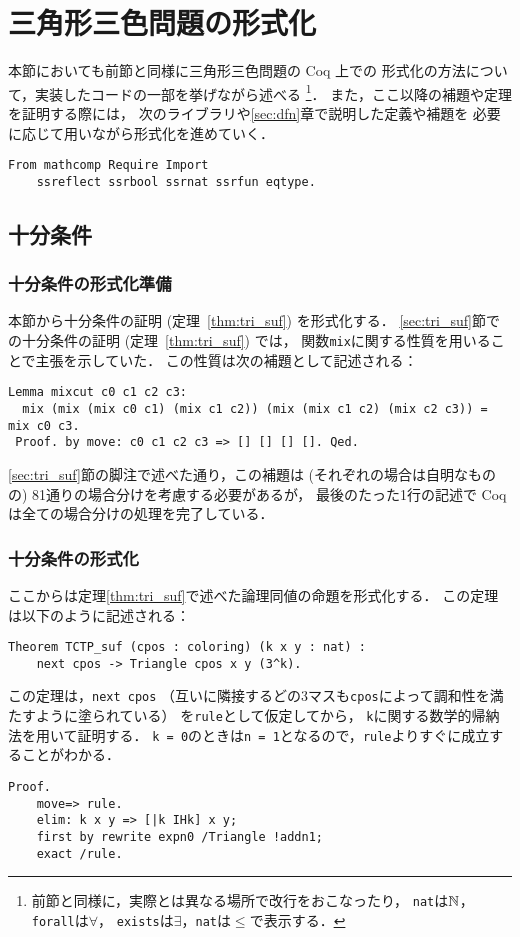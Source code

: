 \section{三角形三色問題の形式化}
本節においても前節と同様に三角形三色問題の Coq 上での
形式化の方法について，実装したコードの一部を挙げながら述べる
\footnote
    {
      前節と同様に，実際とは異なる場所で改行をおこなったり，
      {\tt{nat}}は$\mathbb{N}$，{\tt{forall}}は$\forall$，
      {\tt{exists}}は$\exists$，{\tt{nat}}は$\leq$で表示する．
    }．
また，ここ以降の補題や定理を証明する際には，
次のライブラリや\ref{sec:dfn}章で説明した定義や補題を
必要に応じて用いながら形式化を進めていく．
\begin{lstlisting}[language=Coq]
  From mathcomp Require Import
    ssreflect ssrbool ssrnat ssrfun eqtype.
\end{lstlisting}
  
\subsection{十分条件} \label{sec_suf_coq}
\subsubsection{十分条件の形式化準備}
本節から十分条件の証明 (定理~\ref{thm:tri_suf}) を形式化する．
\ref{sec:tri_suf}節での十分条件の証明 (定理~\ref{thm:tri_suf}) では，
関数{\tt mix}に関する性質を用いることで主張を示していた．
この性質は次の補題として記述される：
\begin{lstlisting}[language=Coq]
 Lemma mixcut c0 c1 c2 c3:
  mix (mix (mix c0 c1) (mix c1 c2)) (mix (mix c1 c2) (mix c2 c3)) = mix c0 c3.
 Proof. by move: c0 c1 c2 c3 => [] [] [] []. Qed.
\end{lstlisting}
\ref{sec:tri_suf}節の脚注で述べた通り，この補題は (それぞれの場合は自明なものの) 81通りの場合分けを考慮する必要があるが，
最後のたった1行の記述で Coq は全ての場合分けの処理を完了している．

\subsubsection{十分条件の形式化}
ここからは定理\ref{thm:tri_suf}で述べた論理同値の命題を形式化する．
この定理は以下のように記述される：
\begin{lstlisting}[language=Coq]
  Theorem TCTP_suf (cpos : coloring) (k x y : nat) :
    next cpos -> Triangle cpos x y (3^k).
\end{lstlisting}
この定理は，{\tt{next cpos}}
（互いに隣接するどの3マスも{\tt{cpos}}によって調和性を満たすように塗られている）
を{\tt{rule}}として仮定してから，
{\tt{k}}に関する数学的帰納法を用いて証明する．
{\tt{k = 0}}のときは{\tt{n = 1}}となるので，{\tt{rule}}よりすぐに成立することがわかる．
\begin{lstlisting}[language=Coq]
  Proof.
    move=> rule.
    elim: k x y => [|k IHk] x y;
    first by rewrite expn0 /Triangle !addn1;
    exact /rule.
\end{lstlisting}

